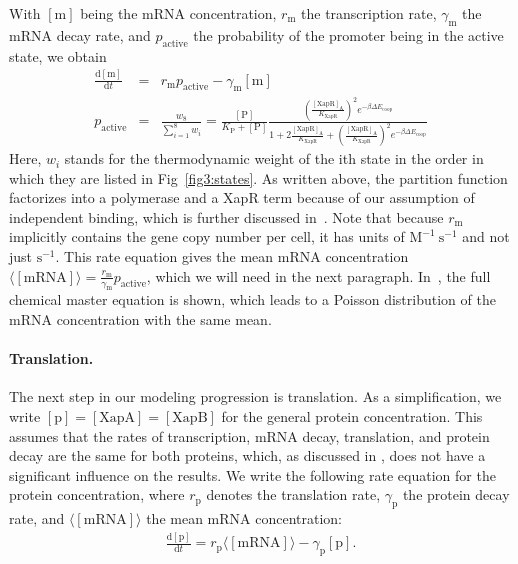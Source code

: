 \documentclass[10pt,letterpaper]{article}
\newcommand{\n}[1]{\mathrm{#1}}
\newcommand{\dd}[2]{\frac{\mathrm{d} #1}{\mathrm{d} #2}}
\begin{document}
With $\n{[m]}$ being the mRNA concentration, $r_{\n{m}}$ the transcription
rate, $\gamma_{\n{m}}$ the mRNA decay rate, and $p_{\n{active}}$ the
probability of the promoter being in the active state, we obtain
\begin{eqnarray}
\label{eq:mbasic}
\dd{\n{[m]}}{t} &=& r_{\n{m}} p_{\n{active}} - \gamma_{\n{m}} \n{[m]} \\
p_{\n{active}} &=& \frac{w_8}{\sum_{i=1}^{8} w_i} = 
\frac{\n{[P]}}{K_{\n{P}}+\n{[P]}} 
\frac{
	\left( \frac{\mathrm{[XapR]_A}}{K_{\mathrm{XapR}}} \right)^2 
	e^{- \beta \Delta E_{\n{coop}}}
}{
	1 + 
	2 \frac{\mathrm{[XapR]_A}}{K_{\mathrm{XapR}}} +
	\left( \frac{\mathrm{[XapR]_A}}{K_{\mathrm{XapR}}} \right)^2 e^{- \beta \Delta E_{\n{coop}}}
}
\end{eqnarray}
Here, $w_i$ stands for the thermodynamic weight of the ith state in the
order in which they are listed in Fig~\ref{fig3:states}. As written above,
the partition function factorizes into a polymerase and a XapR term because
of our assumption of independent binding, which is further discussed
in~. Note that because $r_{\n{m}}$ implicitly contains the
gene copy number per cell, it has units of $\n{M^{-1} \ s^{-1}}$ and not
just $\n{s^{-1}}$. This rate equation gives the mean mRNA concentration
$\langle\n{[mRNA]}\rangle = \frac{r_{\n{m}}}{\gamma_{\n{m}}}
p_{\n{active}}$, which we will need in the next paragraph.
In~, the full chemical master equation is shown, which
leads to a Poisson distribution of the mRNA concentration with the same
mean.

\paragraph*{Translation.} 
The next step in our modeling progression is translation. As a
simplification, we write $\n{[p]}=\n{[XapA]=[XapB]}$ for the general protein
concentration. This assumes that the rates of transcription, mRNA decay,
translation, and protein decay are the same for both proteins, which, as
discussed in , does not have a significant influence on the
results. We write the following rate equation for the protein concentration,
where $r_{\n{p}}$ denotes the translation rate, $\gamma_{\n{p}}$ the protein
decay rate, and $\langle \n{[mRNA]} \rangle$ the mean mRNA concentration:
\begin{eqnarray}
\label{eq:pbasic}
\dd{\n{[p]}}{t} = r_{\n{p}} \langle \n{[mRNA]} \rangle - \gamma_{\n{p}} \n{[p]}.
\end{eqnarray}
\end{document}
